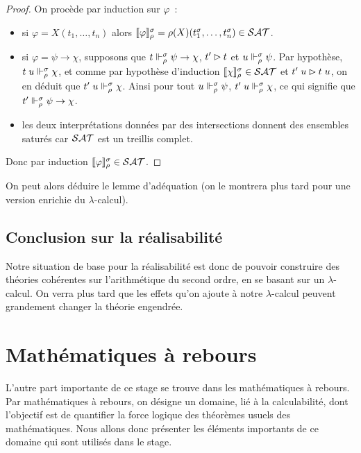 \documentclass{article}
\begin{document}
\begin{proof}
  On procède par induction sur $\varphi$~:
  \begin{itemize}
  \item si $\varphi = X(t_1,\ldots,t_n)$ alors $\llbracket \varphi \rrbracket_\rho^\sigma=\rho(X)(t_1^\sigma,\ldots,t_n^\sigma)\in \mathcal {SAT}$.
  \item si $\varphi = \psi \to \chi$, supposons que $t\Vdash_\rho^\sigma \psi \to \chi$, $t'\rhd t$ et $u\Vdash_\rho^\sigma\psi$. Par hypothèse, $t\;u\Vdash_\rho^\sigma \chi$, et comme par hypothèse d'induction $\llbracket \chi \rrbracket_\rho^\sigma\in\mathcal {SAT}$ et $t'\;u\rhd t\;u$, on en déduit que $t'\;u\Vdash_\rho^\sigma \chi$. Ainsi pour tout $u\Vdash_\rho^\sigma\psi$, $t'\;u\Vdash_\rho^\sigma\chi$, ce qui signifie que $t'\Vdash_\rho^\sigma\psi\to\chi$.
  \item les deux interprétations données par des intersections donnent des ensembles saturés car $\mathcal {SAT}$ est un treillis complet.
  \end{itemize}
  Donc par induction $\llbracket \varphi \rrbracket_\rho^\sigma\in\mathcal {SAT}$.
\end{proof}

On peut alors déduire le lemme d'adéquation (on le montrera plus tard pour une version enrichie du $\lambda$-calcul).

\subsection{Conclusion sur la réalisabilité}

Notre situation de base pour la réalisabilité est donc de pouvoir construire des théories cohérentes sur l'arithmétique du second ordre, en se basant sur un $\lambda$-calcul. On verra plus tard que les effets qu'on ajoute à notre $\lambda$-calcul peuvent grandement changer la théorie engendrée.

\section{Mathématiques à rebours}

L'autre part importante de ce stage se trouve dans les mathématiques à rebours. Par mathématiques à rebours, on désigne un domaine, lié à la calculabilité, dont l'objectif est de quantifier la force logique des théorèmes usuels des mathématiques. Nous allons donc présenter les éléments importants de ce domaine qui sont utilisés dans le stage.
\end{document}
